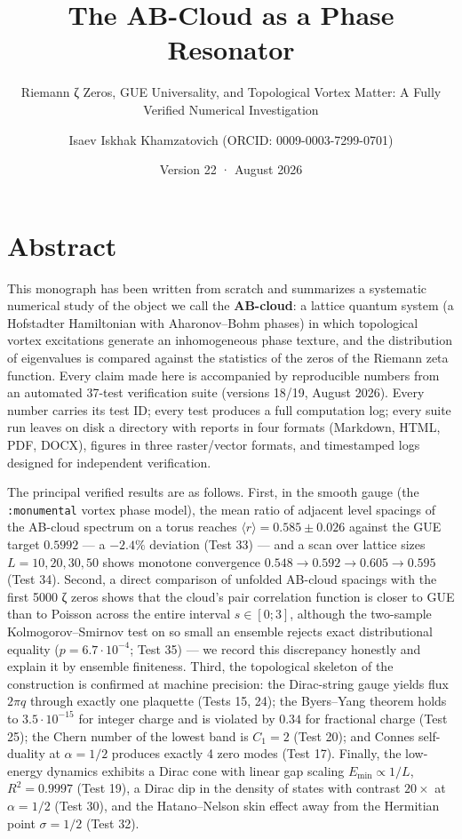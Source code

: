 \documentclass[
]{article}
\title{The AB-Cloud as a Phase Resonator}
\subtitle{Riemann ζ Zeros, GUE Universality, and Topological Vortex
Matter: A Fully Verified Numerical Investigation}
\author{Isaev Iskhak Khamzatovich (ORCID: 0009-0003-7299-0701)}
\date{Version 22 · August 2026}
\begin{document}
\maketitle

\section{Abstract}\label{abstract}

This monograph has been written from scratch and summarizes a systematic
numerical study of the object we call the \textbf{AB-cloud}: a lattice
quantum system (a Hofstadter Hamiltonian with Aharonov--Bohm phases) in
which topological vortex excitations generate an inhomogeneous phase
texture, and the distribution of eigenvalues is compared against the
statistics of the zeros of the Riemann zeta function. Every claim made
here is accompanied by reproducible numbers from an automated 37-test
verification suite (versions 18/19, August 2026). Every number carries
its test ID; every test produces a full computation log; every suite run
leaves on disk a directory with reports in four formats (Markdown, HTML,
PDF, DOCX), figures in three raster/vector formats, and timestamped logs
designed for independent verification.

The principal verified results are as follows. First, in the smooth
gauge (the \texttt{:monumental} vortex phase model), the mean ratio of
adjacent level spacings of the AB-cloud spectrum on a torus reaches
\(\langle r\rangle = 0.585 \pm 0.026\) against the GUE target \(0.5992\)
--- a \(-2.4\%\) deviation (Test 33) --- and a scan over lattice sizes
\(L = 10, 20, 30, 50\) shows monotone convergence
\(0.548 \to 0.592 \to 0.605 \to 0.595\) (Test 34). Second, a direct
comparison of unfolded AB-cloud spacings with the first 5000 ζ zeros
shows that the cloud's pair correlation function is closer to GUE than
to Poisson across the entire interval \(s\in[0;3]\), although the
two-sample Kolmogorov--Smirnov test on so small an ensemble rejects
exact distributional equality (\(p = 6.7\cdot10^{-4}\); Test 35) --- we
record this discrepancy honestly and explain it by ensemble finiteness.
Third, the topological skeleton of the construction is confirmed at
machine precision: the Dirac-string gauge yields flux \(2\pi q\) through
exactly one plaquette (Tests 15, 24); the Byers--Yang theorem holds to
\(3.5\cdot10^{-15}\) for integer charge and is violated by \(0.34\) for
fractional charge (Test 25); the Chern number of the lowest band is
\(C_1 = 2\) (Test 20); and Connes self-duality at \(\alpha = 1/2\)
produces exactly 4 zero modes (Test 17). Finally, the low-energy
dynamics exhibits a Dirac cone with linear gap scaling
\(E_{\min}\propto 1/L\), \(R^2 = 0.9997\) (Test 19), a Dirac dip in the
density of states with contrast \(20\times\) at \(\alpha = 1/2\) (Test
30), and the Hatano--Nelson skin effect away from the Hermitian point
\(\sigma = 1/2\) (Test 32).
\end{document}
